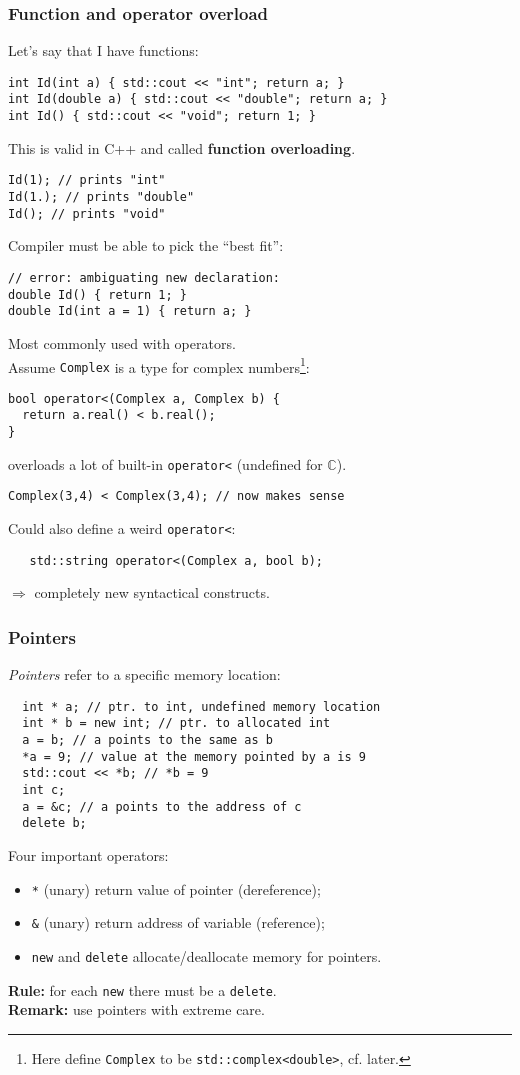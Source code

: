 \documentclass{beamer}
\newcommand{\code}[1]{{\color{cgreen}\texttt{#1}}}
\begin{document}
\begin{frame}
 \frametitle{Function and operator overload}
  Let's say that I have functions:
  \begin{lstlisting}
int Id(int a) { std::cout << "int"; return a; }
int Id(double a) { std::cout << "double"; return a; }
int Id() { std::cout << "void"; return 1; }
  \end{lstlisting}
  This is valid in C++ and called \textbf{function overloading}. \\
  \begin{lstlisting}
Id(1); // prints "int"
Id(1.); // prints "double"
Id(); // prints "void"
  \end{lstlisting}
  Compiler must be able to pick the ``best fit'': \\
  \begin{lstlisting}
// error: ambiguating new declaration:
double Id() { return 1; } 
double Id(int a = 1) { return a; }
  \end{lstlisting}
  \framebreak
  Most commonly used with operators. \\
  Assume \code{Complex} is a type for complex numbers\footnote{Here define \code{Complex} to be \code{std::complex<double>}, cf. later.}:
  \begin{lstlisting}
bool operator<(Complex a, Complex b) {
  return a.real() < b.real();
}
  \end{lstlisting}
  overloads a lot of built-in \code{operator<} (undefined for $\mathbb{C}$).
  \begin{lstlisting}
Complex(3,4) < Complex(3,4); // now makes sense
  \end{lstlisting}
  Could also define a weird \code{operator<}:
  \begin{lstlisting}
   std::string operator<(Complex a, bool b);
  \end{lstlisting}
 $\Rightarrow$ completely new syntactical constructs.
\end{frame}
 
\begin{frame}[fragile]
 \frametitle{Pointers}
 \emph{Pointers} refer to a specific memory location:
 \begin{lstlisting}
  int * a; // ptr. to int, undefined memory location
  int * b = new int; // ptr. to allocated int
  a = b; // a points to the same as b
  *a = 9; // value at the memory pointed by a is 9
  std::cout << *b; // *b = 9
  int c;
  a = &c; // a points to the address of c
  delete b;
 \end{lstlisting}
 Four important operators:
 \begin{itemize}
  \item \code{*} (unary) return value of pointer (dereference);
  \item \code{\&} (unary) return address of variable (reference);
  \item \code{new} and \code{delete} allocate/deallocate memory for pointers.
 \end{itemize}
 \textbf{Rule:} for each \code{new} there must be a \code{delete}. \\
 \textbf{Remark:} use pointers with extreme care.
\end{frame}
\end{document}

